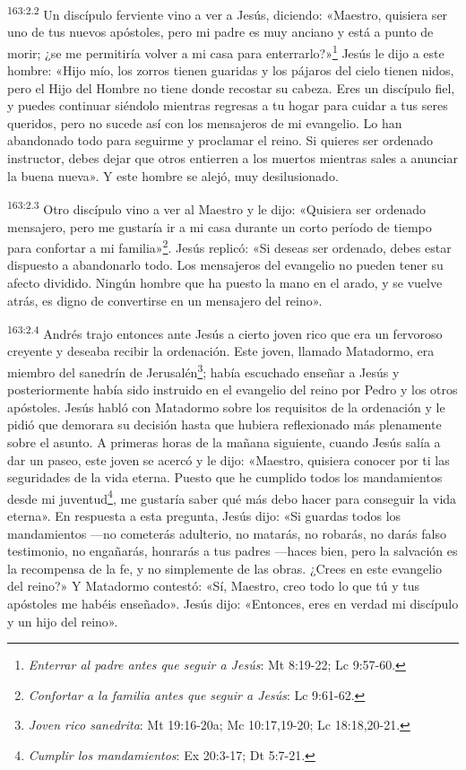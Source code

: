 \par
\textsuperscript{163:2.2} Un discípulo ferviente vino a ver a Jesús, diciendo: «Maestro, quisiera ser uno de tus nuevos apóstoles, pero mi padre es muy anciano y está a punto de morir; ¿se me permitiría volver a mi casa para enterrarlo?»\footnote{\textit{Enterrar al padre antes que seguir a Jesús}: Mt 8:19-22; Lc 9:57-60.} Jesús le dijo a este hombre: «Hijo mío, los zorros tienen guaridas y los pájaros del cielo tienen nidos, pero el Hijo del Hombre no tiene donde recostar su cabeza. Eres un discípulo fiel, y puedes continuar siéndolo mientras regresas a tu hogar para cuidar a tus seres queridos, pero no sucede así con los mensajeros de mi evangelio. Lo han abandonado todo para seguirme y proclamar el reino. Si quieres ser ordenado instructor, debes dejar que otros entierren a los muertos mientras sales a anunciar la buena nueva». Y este hombre se alejó, muy desilusionado.

\par
\textsuperscript{163:2.3} Otro discípulo vino a ver al Maestro y le dijo: «Quisiera ser ordenado mensajero, pero me gustaría ir a mi casa durante un corto período de tiempo para confortar a mi familia»\footnote{\textit{Confortar a la familia antes que seguir a Jesús}: Lc 9:61-62.}. Jesús replicó: «Si deseas ser ordenado, debes estar dispuesto a abandonarlo todo. Los mensajeros del evangelio no pueden tener su afecto dividido. Ningún hombre que ha puesto la mano en el arado, y se vuelve atrás, es digno de convertirse en un mensajero del reino».

\par
\textsuperscript{163:2.4} Andrés trajo entonces ante Jesús a cierto joven rico que era un fervoroso creyente y deseaba recibir la ordenación. Este joven, llamado Matadormo, era miembro del sanedrín de Jerusalén\footnote{\textit{Joven rico sanedrita}: Mt 19:16-20a; Mc 10:17,19-20; Lc 18:18,20-21.}; había escuchado enseñar a Jesús y posteriormente había sido instruido en el evangelio del reino por Pedro y los otros apóstoles. Jesús habló con Matadormo sobre los requisitos de la ordenación y le pidió que demorara su decisión hasta que hubiera reflexionado más plenamente sobre el asunto. A primeras horas de la mañana siguiente, cuando Jesús salía a dar un paseo, este joven se acercó y le dijo: «Maestro, quisiera conocer por ti las seguridades de la vida eterna. Puesto que he cumplido todos los mandamientos desde mi juventud\footnote{\textit{Cumplir los mandamientos}: Ex 20:3-17; Dt 5:7-21.}, me gustaría saber qué más debo hacer para conseguir la vida eterna». En respuesta a esta pregunta, Jesús dijo: «Si guardas todos los mandamientos ---no cometerás adulterio, no matarás, no robarás, no darás falso testimonio, no engañarás, honrarás a tus padres ---haces bien, pero la salvación es la recompensa de la fe, y no simplemente de las obras. ¿Crees en este evangelio del reino?» Y Matadormo contestó: «Sí, Maestro, creo todo lo que tú y tus apóstoles me habéis enseñado». Jesús dijo: «Entonces, eres en verdad mi discípulo y un hijo del reino».

